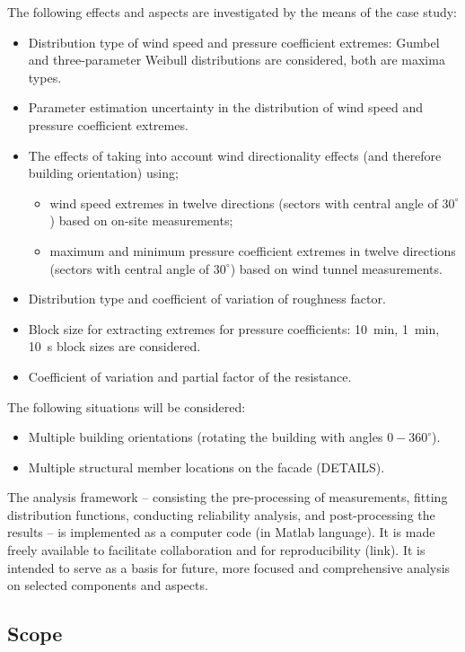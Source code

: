 \documentclass[fleqn]{article}
\begin{document}
The following effects and aspects are investigated by the means of the case study:
\begin{itemize}
	\item Distribution type of wind speed and pressure coefficient extremes: Gumbel and three-parameter Weibull distributions are considered, both are maxima types.
	\item Parameter estimation uncertainty in the distribution of wind speed and pressure coefficient extremes.	
	\item The effects of taking into account wind directionality effects (and therefore building orientation) using; 
	\begin{itemize}
		\item wind speed extremes in twelve directions (sectors with central angle of $30^{\circ}$) based on on-site measurements;
		\item maximum and minimum pressure coefficient extremes in twelve directions (sectors with central angle of $30^{\circ}$) based on wind tunnel measurements.
	\end{itemize}
	\item Distribution type and coefficient of variation of roughness factor.
	\item Block size for extracting extremes for pressure coefficients: 10~min, 1~min, 10~s block sizes are considered.
	\item Coefficient of variation and partial factor of the resistance.
\end{itemize}
The following situations will be considered:
\begin{itemize}
	\item Multiple building orientations (rotating the building with angles $0-360^{\circ}$).
	\item Multiple structural member locations on the facade (DETAILS).
\end{itemize}
The analysis framework -- consisting the pre-processing of measurements, fitting distribution functions, conducting reliability analysis, and post-processing the results -- is implemented as a computer code (in Matlab language). It is made freely available to facilitate collaboration and for reproducibility (link). It is intended to serve as a basis for future, more focused and comprehensive analysis on selected components and aspects.

\subsection{Scope}
\end{document}
